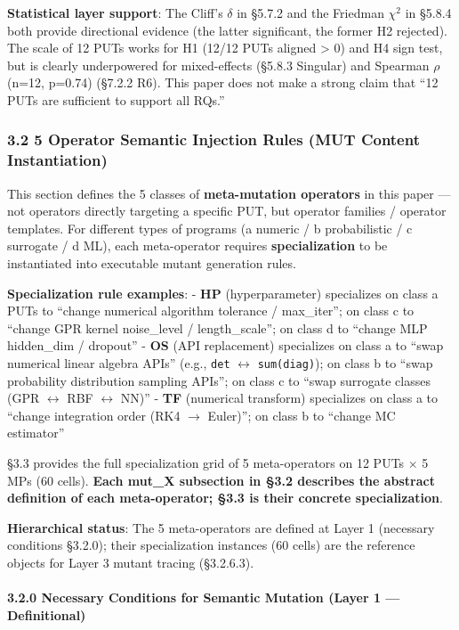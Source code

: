 \documentclass[review,12pt,authoryear]{elsarticle}
\begin{document}
\textbf{Statistical layer support}: The Cliff's $\delta$ in §5.7.2 and the
Friedman $\chi$$^{2}$ in §5.8.4 both provide directional evidence (the latter
significant, the former H2 rejected). The scale of 12 PUTs works for H1
(12/12 PUTs aligned \textgreater{} 0) and H4 sign test, but is clearly
underpowered for mixed-effects (§5.8.3 Singular) and Spearman $\rho$ (n=12,
p=0.74) (§7.2.2 R6). This paper does not make a strong claim that ``12
PUTs are sufficient to support all RQs.''

\subsubsection{3.2 5 Operator Semantic Injection Rules (MUT Content
Instantiation)}\label{operator-semantic-injection-rules-mut-content-instantiation}

This section defines the 5 classes of \textbf{meta-mutation operators}
in this paper --- not operators directly targeting a specific PUT, but
operator families / operator templates. For different types of programs
(a numeric / b probabilistic / c surrogate / d ML), each meta-operator
requires \textbf{specialization} to be instantiated into executable
mutant generation rules.

\textbf{Specialization rule examples}: - \textbf{HP} (hyperparameter)
specializes on class a PUTs to ``change numerical algorithm tolerance /
max\_iter''; on class c to ``change GPR kernel noise\_level /
length\_scale''; on class d to ``change MLP hidden\_dim / dropout'' -
\textbf{OS} (API replacement) specializes on class a to ``swap numerical
linear algebra APIs'' (e.g., \texttt{det} $\leftrightarrow$ \texttt{sum(diag)}); on
class b to ``swap probability distribution sampling APIs''; on class c
to ``swap surrogate classes (GPR $\leftrightarrow$ RBF $\leftrightarrow$ NN)'' - \textbf{TF} (numerical
transform) specializes on class a to ``change integration order (RK4 $\to$
Euler)''; on class b to ``change MC estimator''

§3.3 provides the full specialization grid of 5 meta-operators on 12
PUTs $\times$ 5 MPs (60 cells). \textbf{Each mut\_X subsection in §3.2
describes the abstract definition of each meta-operator; §3.3 is their
concrete specialization}.

\textbf{Hierarchical status}: The 5 meta-operators are defined at Layer
1 (necessary conditions §3.2.0); their specialization instances (60
cells) are the reference objects for Layer 3 mutant tracing (§3.2.6.3).

\paragraph{3.2.0 Necessary Conditions for Semantic Mutation (Layer 1 ---
Definitional)}\label{necessary-conditions-for-semantic-mutation-layer-1-definitional}
\end{document}
